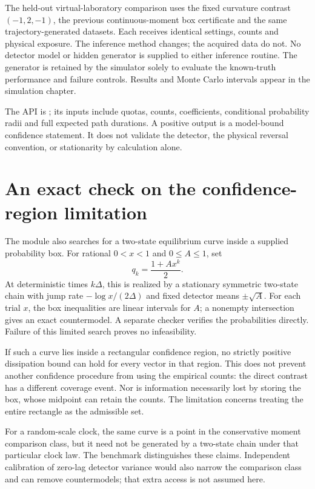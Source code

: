 The held-out virtual-laboratory comparison uses the fixed curvature contrast
$(-1,2,-1)$, the previous continuous-moment box certificate and the same
trajectory-generated datasets. Each receives identical settings, counts and
physical exposure. The inference method changes; the acquired data do not.
No detector model or hidden generator is supplied to either inference routine.
The generator is retained by the simulator solely to evaluate the known-truth
performance and failure controls. Results and Monte Carlo intervals appear in
the simulation chapter.

The API is ; its
inputs include quotas, counts, coefficients, conditional probability radii and
full expected path durations. A positive output is a model-bound confidence
statement. It does not validate the detector, the physical reversal convention,
or stationarity by calculation alone.


\section{An exact check on the confidence-region limitation}
The module also searches for a two-state equilibrium curve inside a supplied
probability box. For rational $0<x<1$ and $0\leq A\leq1$, set
\[
 q_k=\frac{1+A x^k}{2}.
\]
At deterministic times $k\Delta$, this is realized by a stationary symmetric
two-state chain with jump rate $-\log x/(2\Delta)$ and fixed detector means
$\pm\sqrt A$. For each trial $x$, the box inequalities are linear intervals
for $A$; a nonempty intersection gives an exact countermodel. A separate
checker verifies the probabilities directly. Failure of this limited search
proves no infeasibility.

If such a curve lies inside a rectangular confidence region, no strictly
positive dissipation bound can hold for every vector in that region. This does
not prevent another confidence procedure from using the empirical counts: the
direct contrast has a different coverage event. Nor is information necessarily
lost by storing the box, whose midpoint can retain the counts. The limitation
concerns treating the entire rectangle as the admissible set.

For a random-scale clock, the same curve is a point in the conservative moment
comparison class, but it need not be generated by a two-state chain under that
particular clock law. The benchmark distinguishes these claims. Independent
calibration of zero-lag detector variance would also narrow the comparison
class and can remove countermodels; that extra access is not assumed here.
